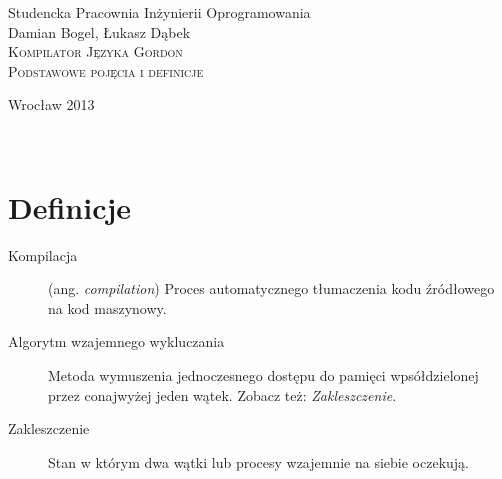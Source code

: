 \documentclass[12pt]{article}
\begin{document}
\begin{titlepage}
\begin{center}
Studencka Pracownia Inżynierii Oprogramowania\\[3.5cm]

Damian Bogel, Łukasz Dąbek\\[1cm]
\textsc{\LARGE Kompilator Języka Gordon}\\[1cm]
\textsc{\large Podstawowe pojęcia i definicje}

\vfill
Wrocław 2013

\end{center}
\end{titlepage}

\newpage
\setcounter{page}{2}
~
\newpage

\section{Definicje}
\begin{description}
    \item[Kompilacja] (ang. \emph{compilation}) Proces automatycznego tłumaczenia kodu
    źródłowego na kod maszynowy.
    \item[Algorytm wzajemnego wykluczania] Metoda wymuszenia jednoczesnego dostępu do pamięci
        wpsółdzielonej przez conajwyżej jeden wątek. Zobacz też: \emph{Zakleszczenie}.
    \item[Zakleszczenie] Stan w którym dwa wątki lub procesy wzajemnie na siebie oczekują.
\end{description}
\end{document}

